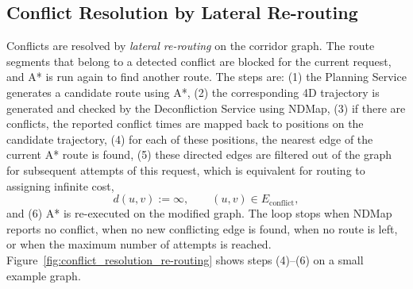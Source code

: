 \subsection{Conflict Resolution by Lateral Re-routing}
\label{sec:conflict_resolution}

Conflicts are resolved by \emph{lateral re-routing} on the corridor graph. The route segments that belong to a detected conflict are blocked for the current request, and A* is run again to find another route. The steps are:
(1) the Planning Service generates a candidate route using A*,
(2) the corresponding 4D trajectory is generated and checked by the Deconfliction Service using NDMap,
(3) if there are conflicts, the reported conflict times are mapped back to positions on the candidate trajectory,
(4) for each of these positions, the nearest edge of the current A* route is found,
(5) these directed edges are filtered out of the graph for subsequent attempts of this request, which is equivalent for routing to assigning infinite cost,
\[
  d(u,v) := \infty, \qquad (u,v)\in E_{\text{conflict}},
\]
and
(6) A* is re-executed on the modified graph.
The loop stops when NDMap reports no conflict, when no new conflicting edge is found, when no route is left, or when the maximum number of attempts is reached. Figure~\ref{fig:conflict_resolution_re-routing} shows steps (4)--(6) on a small example graph.

